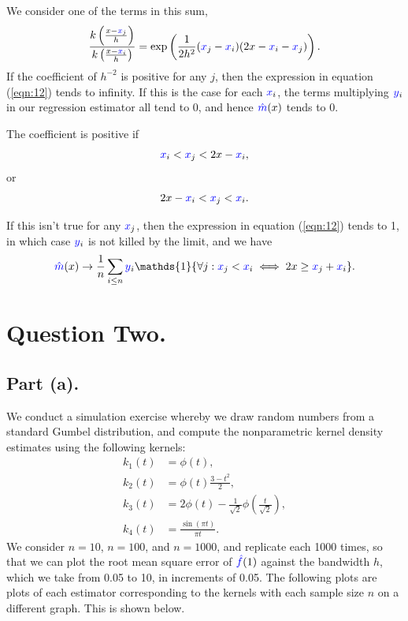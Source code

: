 \documentclass{article}
\renewcommand{\r}[1]{\textcolor{blue}{#1}}
\begin{document}
We consider one of the terms in this sum,
\begin{equation} \frac{k\left(\frac{x-\r{x}_{j}}{h}\right)}{k\left(\frac{x-\r{x}_{i}}{h}\right)} = \exp\left(\frac{1}{2h^{2}}(\r{x}_{j}-\r{x}_{i})(2x-\r{x}_{i}-\r{x}_{j})\right).\end{equation}
If the coefficient of $h^{-2}$ is positive for any $j$, then the expression in equation (\ref{eqn:12}) tends to infinity. If this is the case for each $\r{x}_{i}$, the terms multiplying $\r{y}_{i}$ in our regression estimator all tend to 0, and hence $\r{\hat{m}}(x)$ tends to 0.

The coefficient is positive if
\begin{equation} \r{x}_{i}<\r{x}_{j}<2x-\r{x}_{i},\end{equation}
or
\begin{equation} 2x-\r{x}_{i}<\r{x}_{j}<\r{x}_{i}.\end{equation}

If this isn't true for any $\r{x}_{j}$, then the expression in equation (\ref{eqn:12}) tends to 1, in which case $\r{y}_{i}$ is not killed by the limit, and we have
\begin{equation} \r{\hat{m}}(x) \to \frac{1}{n}\sum_{i\leq n} \r{y}_{i}\mathds{1}\{\forall j: \r{x}_{j}<\r{x}_{i} \iff 2x\geq \r{x}_{j}+\r{x}_{i}\}.\end{equation}

\section{Question Two.}
\subsection{Part (a).}
We conduct a simulation exercise whereby we draw random numbers from a standard Gumbel distribution, and compute the nonparametric kernel density estimates using the following kernels:
\begin{align}
k_{1}(t) &= \phi(t), \\
k_{2}(t) &= \phi(t)\frac{3-t^{2}}{2},\\
k_{3}(t) &= 2\phi(t)-\frac{1}{\sqrt{2}}\phi\left(\frac{t}{\sqrt{2}}\right),\\
k_{4}(t) &= \frac{\sin(\pi t)}{\pi t}.\end{align}
We consider $n=10$, $n=100$, and $n=1000$, and replicate each 1000 times, so that we can plot the root mean square error of $\r{\hat{f}}(1)$ against the bandwidth $h$, which we take from 0.05 to 10, in increments of 0.05. The following plots are plots of each estimator corresponding to the kernels with each sample size $n$ on a different graph. This is shown below.
\end{document}
